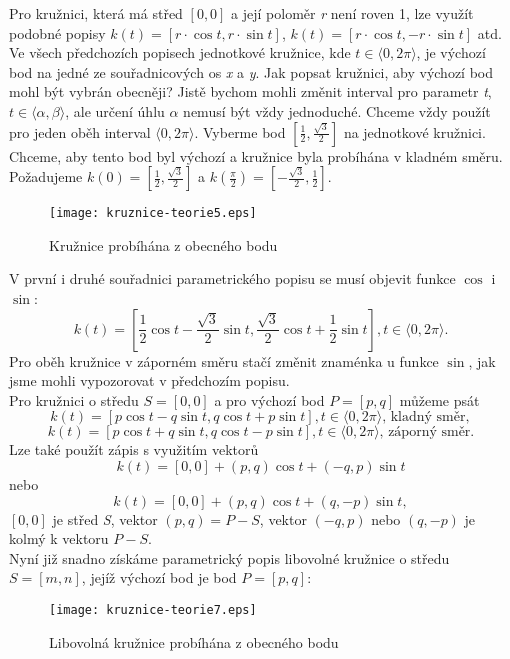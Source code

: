 Pro kružnici, která má střed $[0, 0]$ a její poloměr \textit{r} není roven 1, lze využít podobné popisy
$k(t) = [r\cdot\cos{t}, r\cdot\sin{t}]$, $k(t) = [r\cdot\cos{t}, -r\cdot\sin{t}]$ atd. \\[10pt]
	Ve všech předchozích popisech jednotkové kružnice, kde $t \in \langle0, 2\pi\rangle$, je výchozí bod
	na jedné ze souřadnicových os \textit{x} a \textit{y}. Jak popsat kružnici, aby výchozí bod mohl být
	vybrán obecněji? Jistě bychom mohli změnit interval pro parametr \textit{t}, $t \in \langle\alpha, \beta\rangle$,
	ale určení úhlu $\alpha$ nemusí být vždy jednoduché. Chceme vždy použít pro jeden oběh interval $\langle0, 2\pi\rangle$.
	Vyberme bod $\left[\frac{1}{2}, \frac{\sqrt{3}}{2}\right]$ na jednotkové kružnici. Chceme, aby tento bod byl výchozí
	a kružnice byla probíhána v kladném směru. \\
	Požadujeme $k(0)=\left[\frac{1}{2}, \frac{\sqrt{3}}{2}\right]$ a
	$k\left(\frac{\pi}{2}\right)=\left[-\frac{\sqrt{3}}{2}, \frac{1}{2}\right]$.
	\begin{figure}[H]
		\centering
		\texttt{[image: kruznice-teorie5.eps]}
		\caption{Kružnice probíhána z obecného bodu}					
	\end{figure}
	V první i druhé souřadnici parametrického popisu se musí objevit funkce $\cos$ i $\sin$:
	$$ k(t) = \left[\frac{1}{2}\cos{t}-\frac{\sqrt{3}}{2}\sin{t}, \frac{\sqrt{3}}{2}\cos{t}+\frac{1}{2}\sin{t}\right], t \in \langle0, 2\pi\rangle. $$
	Pro oběh kružnice v záporném směru stačí změnit znaménka u funkce $\sin$, jak jsme mohli vypozorovat v předchozím popisu. \\
	Pro kružnici o středu $S=[0, 0]$ a pro výchozí bod $P=[p, q]$ můžeme psát
	$$k(t) = [p\cos{t}-q\sin{t}, q\cos{t} + p\sin{t}], t \in \langle0, 2\pi\rangle \text{, kladný směr},$$
	$$k(t) = [p\cos{t}+q\sin{t}, q\cos{t} - p\sin{t}], t \in \langle0, 2\pi\rangle \text{, záporný směr}.$$
	Lze také použít zápis s využitím vektorů
	$$k(t) = [0, 0] + (p, q)\cos{t}+(-q, p)\sin{t}$$ nebo
	$$k(t) = [0, 0] + (p, q)\cos{t}+(q, -p)\sin{t},$$
	$[0, 0]$ je střed \textit{S}, vektor $(p, q) = P - S$, vektor $(-q, p)$ nebo $(q, -p)$ je kolmý k vektoru $P-S$. \\	
	\noindent Nyní již snadno získáme parametrický popis libovolné kružnice o středu $S=[m, n]$, jejíž výchozí bod je
	bod $P=[p, q]$:
	\begin{figure}[H]
		\centering
		\texttt{[image: kruznice-teorie7.eps]}
		\caption{Libovolná kružnice probíhána z obecného bodu}					
	\end{figure}	
